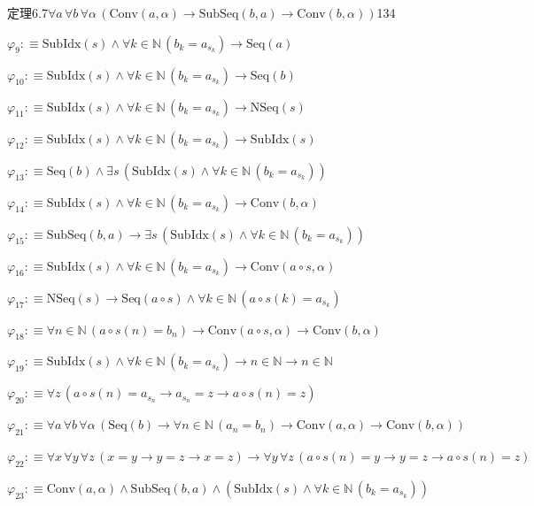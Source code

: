 \begin{fullproof}{定理6.7}{$\forall a\,\forall b\,\forall \alpha\,(\mathrm{Conv}(a,\alpha) \to \mathrm{SubSeq}(b,a) \to \mathrm{Conv}(b,\alpha))$}{134}
\begin{abbrevlist}
\item $\varphi_{9} :\equiv \mathrm{SubIdx}(s) \land \forall k \in \mathbb{N}\,(b_{k} = a_{s_{k}}) \to \mathrm{Seq}(a)$
\item $\varphi_{10} :\equiv \mathrm{SubIdx}(s) \land \forall k \in \mathbb{N}\,(b_{k} = a_{s_{k}}) \to \mathrm{Seq}(b)$
\item $\varphi_{11} :\equiv \mathrm{SubIdx}(s) \land \forall k \in \mathbb{N}\,(b_{k} = a_{s_{k}}) \to \mathrm{NSeq}(s)$
\item $\varphi_{12} :\equiv \mathrm{SubIdx}(s) \land \forall k \in \mathbb{N}\,(b_{k} = a_{s_{k}}) \to \mathrm{SubIdx}(s)$
\item $\varphi_{13} :\equiv \mathrm{Seq}(b) \land \exists s\,(\mathrm{SubIdx}(s) \land \forall k \in \mathbb{N}\,(b_{k} = a_{s_{k}}))$
\item $\varphi_{14} :\equiv \mathrm{SubIdx}(s) \land \forall k \in \mathbb{N}\,(b_{k} = a_{s_{k}}) \to \mathrm{Conv}(b,\alpha)$
\item $\varphi_{15} :\equiv \mathrm{SubSeq}(b,a) \to \exists s\,(\mathrm{SubIdx}(s) \land \forall k \in \mathbb{N}\,(b_{k} = a_{s_{k}}))$
\item $\varphi_{16} :\equiv \mathrm{SubIdx}(s) \land \forall k \in \mathbb{N}\,(b_{k} = a_{s_{k}}) \to \mathrm{Conv}(a \circ s,\alpha)$
\item $\varphi_{17} :\equiv \mathrm{NSeq}(s) \to \mathrm{Seq}(a \circ s) \land \forall k \in \mathbb{N}\,(a \circ s(k) = a_{s_{k}})$
\item $\varphi_{18} :\equiv \forall n \in \mathbb{N}\,(a \circ s(n) = b_{n}) \to \mathrm{Conv}(a \circ s,\alpha) \to \mathrm{Conv}(b,\alpha)$
\item $\varphi_{19} :\equiv \mathrm{SubIdx}(s) \land \forall k \in \mathbb{N}\,(b_{k} = a_{s_{k}}) \to n \in \mathbb{N} \to n \in \mathbb{N}$
\item $\varphi_{20} :\equiv \forall z\,(a \circ s(n) = a_{s_{n}} \to a_{s_{n}} = z \to a \circ s(n) = z)$
\item $\varphi_{21} :\equiv \forall a\,\forall b\,\forall \alpha\,(\mathrm{Seq}(b) \to \forall n \in \mathbb{N}\,(a_{n} = b_{n}) \to \mathrm{Conv}(a,\alpha) \to \mathrm{Conv}(b,\alpha))$
\item $\varphi_{22} :\equiv \forall x\,\forall y\,\forall z\,(x = y \to y = z \to x = z) \to \forall y\,\forall z\,(a \circ s(n) = y \to y = z \to a \circ s(n) = z)$
\item $\varphi_{23} :\equiv \mathrm{Conv}(a,\alpha) \land \mathrm{SubSeq}(b,a) \land (\mathrm{SubIdx}(s) \land \forall k \in \mathbb{N}\,(b_{k} = a_{s_{k}}))$

\end{abbrevlist}
\end{fullproof}
